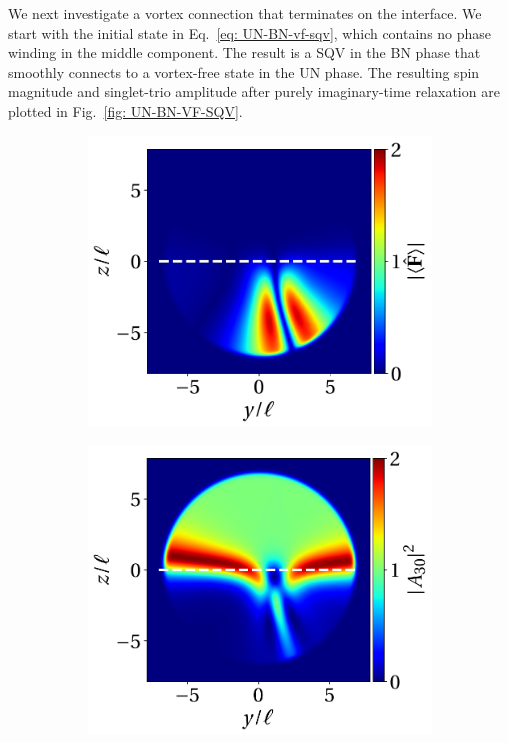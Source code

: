 We next investigate a vortex connection that terminates on the interface.
We start with the initial state in Eq.~\eqref{eq: UN-BN-vf-sqv}, which contains
no phase winding in the middle component.
The result is a SQV in the BN phase that smoothly connects to a vortex-free
state in the UN phase.
The resulting spin magnitude and singlet-trio amplitude after purely
imaginary-time relaxation are plotted in Fig.~\ref{fig: UN-BN-VF-SQV}.
\begin{figure}
    \centering
    \begin{subfigure}{0.45\textwidth}
        \includegraphics[width=\textwidth]
        {gfx/ch-spin2/UN-BN_VF-SQV_spin_mag.pdf}
        \caption{}
    \end{subfigure}
    \begin{subfigure}{0.45\textwidth}
        \includegraphics[width=\textwidth]{gfx/ch-spin2/UN-BN_VF-SQV_a30.pdf}

\end{subfigure}
\end{figure}

